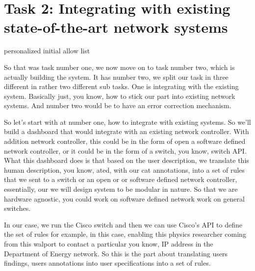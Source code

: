 \section{Task 2: Integrating with existing state-of-the-art network systems}


personalized initial allow list


So that was task number one, we now move on to task number two, which is actually building the system. It has number two, we split our task in three different in rather two different sub tasks. One is integrating with the existing system. Basically just, you know, how to stick our part into existing network systems. And number two would be to have an error correction mechanism.

So let's start with at number one, how to integrate with existing systems. So we'll build a dashboard that would integrate with an existing network controller. With addition network controller, this could be in the form of open a software defined network controller, or it could be in the form of a switch, you know, switch API. What this dashboard does is that based on the user description, we translate this human description, you know, ated, with our cat annotations, into a set of rules that we sent to a switch or an open or or software defined network controller, essentially, our we will design system to be modular in nature. So that we are hardware agnostic, you could work on software defined network work on general switches.

In our case, we run the Cisco switch and then we can use Cisco's API to define the set of rules for example, in this case, enabling this physics researcher coming from this walport to contact a particular you know, IP address in the Department of Energy network. So this is the part about translating users findings, users annotations into user specifications into a set of rules.

